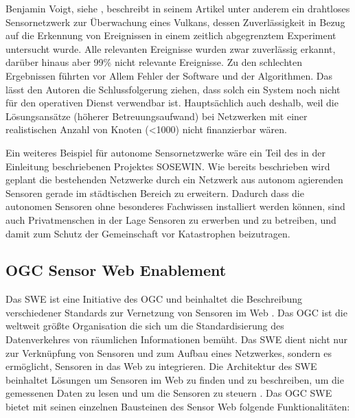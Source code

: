 Benjamin Voigt, siehe \citep{voigt_illustration_2013}, beschreibt in seinem Artikel unter anderem ein drahtloses Sensornetzwerk zur Überwachung eines Vulkans, dessen Zuverlässigkeit in Bezug auf die Erkennung von Ereignissen in einem zeitlich abgegrenztem Experiment untersucht wurde. Alle relevanten Ereignisse wurden zwar zuverlässig erkannt, darüber hinaus aber 99\%  nicht relevante Ereignisse. Zu den schlechten Ergebnissen führten vor Allem Fehler der Software und der Algorithmen. Das lässt den Autoren die Schlussfolgerung ziehen, dass solch ein System noch nicht für den operativen Dienst verwendbar ist. Hauptsächlich auch deshalb, weil die Lösungsansätze (höherer Betreuungsaufwand) bei Netzwerken mit einer realistischen Anzahl von Knoten (<1000) nicht finanzierbar wären.

Ein weiteres Beispiel für autonome Sensornetzwerke wäre ein Teil des in der Einleitung beschriebenen Projektes \gls{SOSEWIN}. Wie bereits beschrieben wird geplant die bestehenden Netzwerke durch ein Netzwerk aus autonom agierenden Sensoren gerade im städtischen Bereich zu erweitern. Dadurch dass die autonomen Sensoren ohne besonderes Fachwissen installiert werden können, sind auch Privatmenschen in der Lage Sensoren zu erwerben und zu betreiben, und damit zum Schutz der Gemeinschaft vor Katastrophen beizutragen.


\subsection{OGC Sensor Web Enablement}
Das  \gls{SWE} ist eine Initiative des  \gls{OGC} und beinhaltet die Beschreibung verschiedener Standards zur Vernetzung von Sensoren im Web \citep{botts_ogc_2008}\citep{bermudez_ogc_2011}. Das \gls{OGC} ist die weltweit größte Organisation die sich um die Standardisierung des Datenverkehres von räumlichen Informationen bemüht. Das \gls{SWE} dient nicht nur zur Verknüpfung von Sensoren und zum Aufbau eines Netzwerkes, sondern es ermöglicht, Sensoren in das Web zu integrieren. Die Architektur des \gls{SWE} beinhaltet Lösungen um Sensoren im Web zu finden und zu beschreiben, um die gemessenen Daten zu lesen und um die Sensoren zu steuern \citep{botts_ogc_2008}\citep{broring_new_2011}. Das \gls{OGC} \gls{SWE} bietet mit seinen einzelnen Bausteinen des Sensor Web folgende Funktionalitäten:


